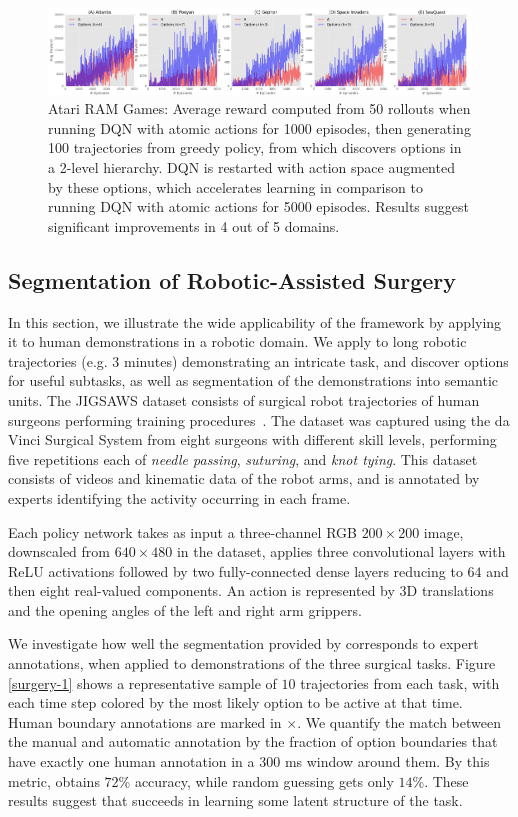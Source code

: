 \begin{figure}[ht!]
    \centering
    \includegraphics[width=\textwidth]{ddco-experiments/exp5-atari.png}
    \caption{Atari RAM Games: Average reward computed from 50 rollouts when running DQN with atomic actions for 1000 episodes, then generating 100 trajectories from greedy policy, from which \alg discovers options in a 2-level hierarchy. DQN is restarted with action space augmented by these options, which accelerates learning in comparison to running DQN with atomic actions for 5000 episodes. Results suggest significant improvements in 4 out of 5 domains. \label{atari-1}}\vspace{-1em}
\end{figure}

\subsection*{Segmentation of Robotic-Assisted Surgery}
In this section, we illustrate the wide applicability of the \alg framework by applying it to human demonstrations in a robotic domain. We apply \alg to long robotic trajectories (e.g. 3 minutes) demonstrating an intricate task, and discover options for useful subtasks, as well as segmentation of the demonstrations into semantic units.
The JIGSAWS dataset consists of surgical robot trajectories of human surgeons performing training procedures~\citep{gao2014jigsaws}. 
The dataset was captured using the da Vinci Surgical System from eight surgeons with different skill levels, performing five repetitions each of \emph{needle passing}, \emph{suturing}, and \emph{knot tying}.
This dataset consists of videos and kinematic data of the robot arms, and is annotated by experts identifying the activity occurring in each frame.

Each policy network takes as input a three-channel RGB $200 \times 200$ image, downscaled from $640 \times 480$ in the dataset, applies three convolutional layers with ReLU activations followed by two fully-connected dense layers reducing to $64$ and then eight real-valued components. An action is represented by 3D translations and the opening angles of the left and right arm grippers.

We investigate how well the segmentation provided by \alg corresponds to expert annotations, when applied to demonstrations of the three surgical tasks. Figure \ref{surgery-1} shows a representative sample of $10$ trajectories from each task, with each time step colored by the most likely option to be active at that time. Human boundary annotations are marked in $\times$. We quantify the match between the manual and automatic annotation by the fraction of option boundaries that have exactly one human annotation in a $300$ ms window around them. By this metric, \alg obtains $72$\% accuracy, while random guessing gets only $14$\%. These results suggest that \alg succeeds in learning some latent structure of the task.

